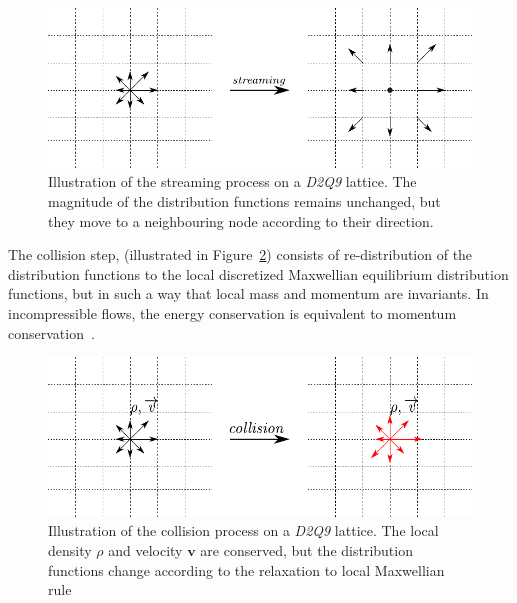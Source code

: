 \clearpage
\begin{figure}[h]
\centering
\includegraphics{Chapter3/figures/lbm/stream.pdf}
\caption[Illustration of the streaming process on a \textit{D2Q9} lattice]{Illustration of the streaming process on a \textit{D2Q9} lattice. The magnitude of the distribution functions remains unchanged, but they move to a neighbouring node according to their direction.}
\label{fig:stream}
\end{figure}
The collision step, (illustrated in Figure~\ref{fig:collision}) consists of re-distribution of the distribution functions to the local discretized Maxwellian equilibrium distribution functions, but in such a way that local mass and momentum are invariants. In incompressible flows, the energy conservation is equivalent to momentum conservation~\citep{he1997}.
\begin{figure}[htbp]
\centering
\includegraphics{Chapter3/figures/lbm/collision.pdf}
\caption[Illustration of the collision process on a \textit{D2Q9} lattice]{Illustration of the collision process on a \textit{D2Q9} lattice. The local density $\rho$ and velocity $\mathbf{v}$ are conserved, but the distribution functions change according to the relaxation to local Maxwellian rule}
\label{fig:collision}
\end{figure} 

